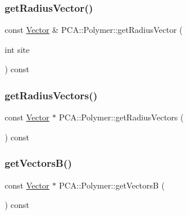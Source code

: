 \hypertarget{class_p_c_a_1_1_polymer_ab2ea86763e0f0be646ef6aa6a105f927}{}\label{class_p_c_a_1_1_polymer_ab2ea86763e0f0be646ef6aa6a105f927} 
\subsubsection{\texorpdfstring{get\+Radius\+Vector()}{getRadiusVector()}}
{\footnotesize\ttfamily const \hyperlink{class_p_c_a_1_1_vector}{Vector} \& P\+C\+A\+::\+Polymer\+::get\+Radius\+Vector (\begin{DoxyParamCaption}\item[{int}]{site }\end{DoxyParamCaption}) const}

\hypertarget{class_p_c_a_1_1_polymer_a6e913f9b50a164c828f9a3cb89e452e1}{}\label{class_p_c_a_1_1_polymer_a6e913f9b50a164c828f9a3cb89e452e1} 
\subsubsection{\texorpdfstring{get\+Radius\+Vectors()}{getRadiusVectors()}}
{\footnotesize\ttfamily const \hyperlink{class_p_c_a_1_1_vector}{Vector} $\ast$ P\+C\+A\+::\+Polymer\+::get\+Radius\+Vectors (\begin{DoxyParamCaption}{ }\end{DoxyParamCaption}) const}

\hypertarget{class_p_c_a_1_1_polymer_a4a90f901ceb688b0d96b126cc2ba3678}{}\label{class_p_c_a_1_1_polymer_a4a90f901ceb688b0d96b126cc2ba3678} 
\subsubsection{\texorpdfstring{get\+Vectors\+B()}{getVectorsB()}}
{\footnotesize\ttfamily const \hyperlink{class_p_c_a_1_1_vector}{Vector} $\ast$ P\+C\+A\+::\+Polymer\+::get\+VectorsB (\begin{DoxyParamCaption}{ }\end{DoxyParamCaption}) const}

